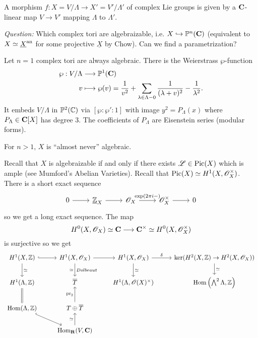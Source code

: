 \begin{exercise}
	A morphism $f:X=V /\Lambda \to X' = V' /\Lambda'$ of complex Lie groups is given by a $\bb{C}$-linear map $V\to V'$ mapping $\Lambda$ to $\Lambda'$.
\end{exercise}

\emph{Question:} Which complex tori are algebraizable, i.e. $X\injto \P^{n}(\bb{C})$ (equivalent to $X\simeq \underline{X}\an$ for some projective $\underline{X}$ by Chow). Can we find a parametrization?

\begin{example}
	Let $n=1$ complex tori are always algebraic. There is the Weierstrass $\wp$-function
	\begin{align*}
		\wp: V /\Lambda &\longrightarrow \P^{1}(\bb{C}) \\
		v &\longmapsto \wp(v) = \frac{1}{v^2} + \sum_{\lambda\in \Lambda-0}\frac{1}{(\lambda+v)^2}-\frac{1}{\lambda^2}
	.\end{align*}
	It embeds $V /\Lambda$ in $\P^2(\mathbb{C})$ via $[\wp:\wp':1]$ with image $y^2=P_\Lambda(x)$ where $P_\Lambda\in \bb{C}[X]$ has degree 3. The coefficients of $P_\Lambda$ are Eisenstein series (modular forms).

	For $n>1$, $X$ is ``almost never'' algebraic.
\end{example}
Recall that $X$ is algebraizable if and only if there exists $\CL\in \Pic(X)$ which is ample (see Mumford's Abelian Varieties). Recall that $\Pic(X)\simeq H^{1}(X,\OO_X^{\times})$. There is a short exact sequence
\begin{equation}
\begin{tikzcd}
	0 \ar[r] & \Zc_X \ar[r] & \OO_X \ar[r,"\exp(2\pi i-)"] & \OO_X^{\times} \ar[r] & 0
\end{tikzcd}
\end{equation}
so we get a long exact sequence. The map
\[
	H^{0}(X,\OO_X) \simeq \bb{C} \to \bb{C}^{\times}\simeq H^{0}(X,\OO_X^{\times})
\]
is surjective so we get
\begin{equation}
\begin{tikzcd}
	H^{1}(X,\Z) \ar[r,hook] \ar[d,"\simeq"] & H^{1}(X,\OO_X) \ar[d,"\simeq"',"Dolbeaut"] \ar[r] & H^{1}(X,\OO_X) \ar[d,"\simeq"] \ar[r,"\delta"] & \ker (H^2(X,\Z)\to H^2(X,\OO_X)) \ar[d,"\simeq"] \\
	H^{1}(\Lambda,\Z) \ar[d,equal] & \overline{T} & H^{1}(\Lambda,\OO(X)^{\times}) & \Hom\left( \bigwedge^2\Lambda,\Z \right)  \\
	\Hom(\Lambda,\Z) \ar[dr,hook] & T \oplus \overline{T} \ar[u,"\pr_2"] \\
				      & \Hom_{\bb{R}}(V,\bb{C}) \ar[u,"\simeq"]
\end{tikzcd}
\end{equation}
